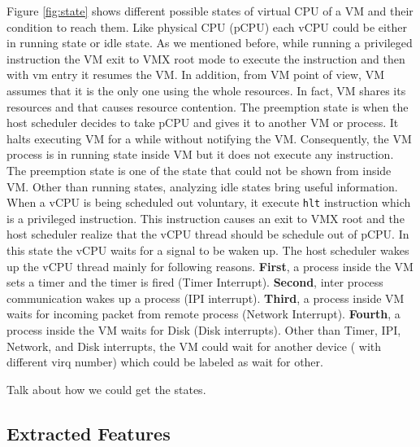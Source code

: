 \documentclass[10pt, conference, compsocconf]{IEEEtran}
\begin{document}
Figure \ref{fig:state} shows different possible states of virtual CPU of a VM and their condition to reach them. Like physical CPU (pCPU) each vCPU could be either in running state or idle state. As we mentioned before, while running a privileged instruction the VM exit to VMX root mode to execute the instruction and then with vm entry it resumes the VM. In addition, from VM point of view, VM assumes that it is the only one using the whole resources. In fact, VM shares its resources and that causes resource contention. The preemption state is when the host scheduler decides to take pCPU and gives it to another VM or process. It halts executing VM for a while without notifying the VM. Consequently, the VM process is in running state inside VM but it does not execute any instruction. The preemption state is one of the state that could not be shown from inside VM. Other than running states, analyzing idle states bring useful information. When a vCPU is being scheduled out voluntary, it execute \texttt{hlt} instruction which is a privileged instruction. This instruction causes an exit to VMX root and the host scheduler realize that the vCPU thread should be schedule out of pCPU. In this state the vCPU
waits for a signal to be waken up. The host scheduler wakes up the vCPU thread mainly for following reasons. \textbf{First}, a process inside the VM sets a timer and the timer is fired (Timer Interrupt). \textbf{Second}, inter process communication wakes up a process (IPI interrupt). \textbf{Third}, a process inside VM waits for incoming packet from remote process (Network Interrupt). \textbf{Fourth}, a process inside the VM waits for Disk (Disk interrupts). Other than Timer, IPI, Network, and Disk interrupts, the VM could wait for another device ( with different virq number) which could be labeled as wait for other. 

Talk about how we could get the states. 

\subsection{Extracted Features}
\end{document}
